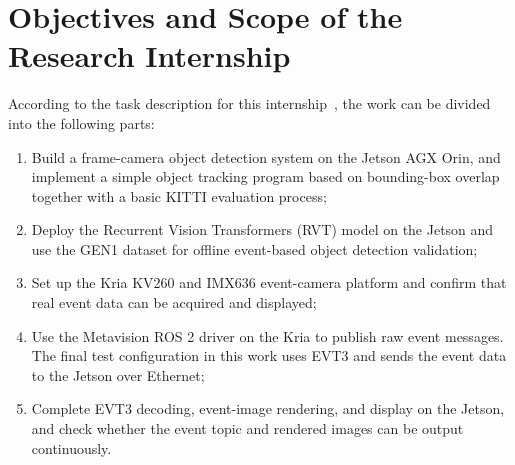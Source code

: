 \section{Objectives and Scope of the Research Internship}

According to the task description for this internship~\parencite{fpMainTasks}, the work can be divided into the following parts:

\begin{enumerate}[label=\arabic*.]
    \item Build a frame-camera object detection system on the Jetson AGX Orin, and implement a simple object tracking program based on bounding-box overlap together with a basic KITTI evaluation process;
    \item Deploy the Recurrent Vision Transformers (RVT) model on the Jetson and use the GEN1 dataset for offline event-based object detection validation;
    \item Set up the Kria KV260 and IMX636 event-camera platform and confirm that real event data can be acquired and displayed;
    \item Use the Metavision ROS 2 driver on the Kria to publish raw event messages. The final test configuration in this work uses EVT3 and sends the event data to the Jetson over Ethernet;
    \item Complete EVT3 decoding, event-image rendering, and display on the Jetson, and check whether the event topic and rendered images can be output continuously.
\end{enumerate}
